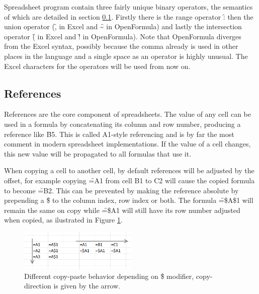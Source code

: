 Spreadsheet program contain three fairly unique binary operators, the semantics of which are detailed in section \ref{sec:references}.
Firstly there is the range operator \f{:} then the union operator (\f{,} in Excel and \f{\textasciitilde} in OpenFormula) and lastly the intersection operator (\f{} in Excel and \f{!} in OpenFormula).
Note that OpenFormula diverges from the Excel syntax, possibly because the comma already is used in other places in the language and a single space as an operator is highly unusual.
The Excel characters for the operators will be used from now on.

\subsection{References}
\label{sec:references}
References are the core component of spreadsheets.
The value of any cell can be used in a formula by concatenating its column and row number, producing a reference like \f{B5}.
This is called A1-style referencing and is by far the most comment in modern spreadsheet implementations.
If the value of a cell changes, this new value will be propagated to all formulas that use it.

When copying a cell to another cell, by default references will be adjusted by the offset, for example copying \f{=A1} from cell B1 to C2 will cause the copied formula to become \f{=B2}.
This can be prevented by making the reference absolute by prepending a \f{\$} to the column index, row index or both.
The formula \f{=\$A\$1} will remain the same on copy while \f{=\$A1} will still have its row number adjusted when copied, as ilustrated in Figure \ref{fig:copy-modifiers}.

\begin{figure}
\centerfloat
\includegraphics[width=0.5\textwidth]{anatomy/copying}
\caption{Different copy-paste behavior depending on \f{\$} modifier, copy-direction is given by the arrow.}
\label{fig:copy-modifiers}
\end{figure}


